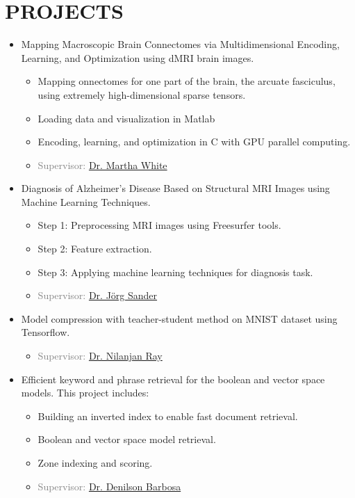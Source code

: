 \documentclass[10pt,a4paper,sans]{moderncv} %
\begin{document}
	\section{PROJECTS}
	\vspace{0.3em}
	\begin{itemize}
		
		\item Mapping Macroscopic Brain Connectomes via
		Multidimensional Encoding, Learning, and Optimization using dMRI brain images.
		\begin{itemize}
			\item Mapping onnectomes for one
			part of the brain, the arcuate fasciculus, using extremely high-dimensional sparse tensors.
			\item Loading data and visualization in Matlab
			\item Encoding, learning, and optimization in C with GPU parallel computing.
			\item \textcolor{gray}{Supervisor: \href{http://webdocs.cs.ualberta.ca/~whitem/}{Dr. Martha White}}
		\end{itemize}
		
		\item Diagnosis of Alzheimer's Disease Based on Structural MRI Images using Machine Learning Techniques.
		\begin{itemize}
			\item Step 1: Preprocessing MRI images using Freesurfer tools.
			\item Step 2: Feature extraction.
			\item Step 3: Applying machine learning techniques for diagnosis task.
			\item \textcolor{gray}{Supervisor: \href{http://webdocs.cs.ualberta.ca/~joerg/}{Dr. Jörg Sander}}
			
		\end{itemize}
		
		\item Model compression with teacher-student method on MNIST dataset using Tensorflow.
		\begin{itemize}
			\item \textcolor{gray}{Supervisor: \href{https://webdocs.cs.ualberta.ca/~nray1/}{Dr. Nilanjan Ray}}
		\end{itemize}
		
		\item Efficient keyword and phrase retrieval for the boolean and vector space models. This project includes:
		\begin{itemize}
			\item Building an inverted index to enable fast document retrieval.
			\item Boolean and vector space model retrieval.
			\item Zone indexing and scoring.
			\item \textcolor{gray}{Supervisor: \href{https://sites.ualberta.ca/~denilson/}{Dr. Denilson Barbosa}}
		\end{itemize}
		
	\end{itemize}
	
\end{document}

